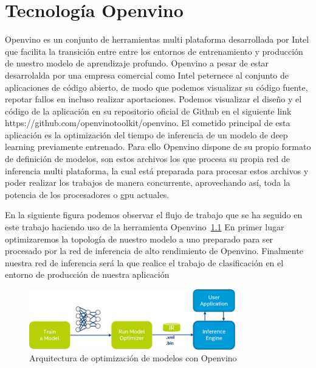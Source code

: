 \cleardoublepage
\mbox{}

\lstset{
language=Python,
basicstyle=\small\sffamily,
numbers=left,
numberstyle=\tiny,
frame=tb,
columns=fullflexible,
showstringspaces=false
}

\chapter{Tecnología Openvino}
\label{ch:chapter3}
Openvino es un conjunto de herramientas multi plataforma desarrollada por Intel que facilita la transición entre entre los entornos de entrenamiento y producción de nuestro modelo de aprendizaje profundo.
Openvino a pesar de estar desarrolalda por una empresa comercial como Intel peternece al conjunto de aplicaciones de código abierto, de modo que podemos visualizar su código fuente, repotar fallos en incluso realizar aportaciones.
Podemos visualizar el diseño y el código de la aplicación en su repositorio oficial de Github en el siguiente link https://github.com/openvinotoolkit/openvino.
El cometido principal de esta aplicación es la optimización del tiempo de inferencia de un modelo de deep learning previamente entrenado.
Para ello Openvino dispone de su propio formato de definición de modelos, son estos archivos los que procesa su propia red de inferencia multi plataforma, la cual está preparada para procesar estos archivos y poder
realizar los trabajos de manera concurrente, aprovechando así, toda la potencia de los procesadores o gpu actuales.


En la siguiente figura podemos observar el flujo de trabajo que se ha seguido en este trabajo haciendo uso de la herramienta Openvino~\ref{fig:Arquitectura de optimización de modelos con Openvino}
En primer lugar optimizaremos la topología de nuestro modelo a uno preparado para ser procesado por la red de inferencia de alto rendimiento de Openvino.
Finalmente nuestra red de inferencia será la que realice el trabajo de clasificación en el entorno de producción de nuestra aplicación

\begin{figure}
    \centering
    \includegraphics[width=0.8\textwidth]{images/chapter3/openvino_workflow.png}
    \caption{Arquitectura de optimización de modelos con Openvino}
    \label{fig:Arquitectura de optimización de modelos con Openvino}
\end{figure}


